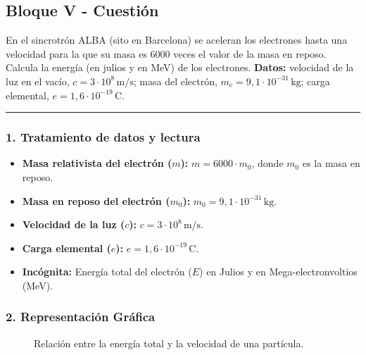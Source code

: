 \newpage

\subsection{Bloque V - Cuestión}
\label{subsec:A5_2013_jul_ext}

\begin{cajaenunciado}
En el sincrotrón ALBA (sito en Barcelona) se aceleran los electrones hasta una velocidad para la que su masa es 6000 veces el valor de la masa en reposo. Calcula la energía (en julios y en MeV) de los electrones.
\textbf{Datos:} velocidad de la luz en el vacío, $c=3 \cdot 10^8\,\text{m/s}$; masa del electrón, $m_e = 9,1 \cdot 10^{-31}\,\text{kg}$; carga elemental, $e = 1,6 \cdot 10^{-19}\,\text{C}$.
\end{cajaenunciado}
\hrule

\subsubsection*{1. Tratamiento de datos y lectura}
\begin{itemize}
    \item \textbf{Masa relativista del electrón ($m$):} $m = 6000 \cdot m_0$, donde $m_0$ es la masa en reposo.
    \item \textbf{Masa en reposo del electrón ($m_0$):} $m_0 = 9,1 \cdot 10^{-31}\,\text{kg}$.
    \item \textbf{Velocidad de la luz ($c$):} $c = 3 \cdot 10^8\,\text{m/s}$.
    \item \textbf{Carga elemental ($e$):} $e = 1,6 \cdot 10^{-19}\,\text{C}$.
    \item \textbf{Incógnita:} Energía total del electrón ($E$) en Julios y en Mega-electronvoltios (MeV).
\end{itemize}

\subsubsection*{2. Representación Gráfica}
\begin{figure}[H]
    \centering
    \caption{Relación entre la energía total y la velocidad de una partícula.}
\end{figure}

